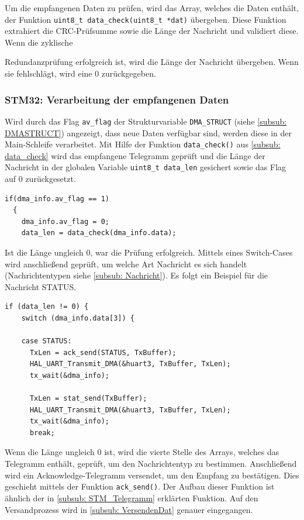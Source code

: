 \smallskip

Um die empfangenen Daten zu prüfen, wird das Array, welches die Daten enthält, der Funktion \lstinline!uint8_t data_check(uint8_t *dat)!
übergeben. Diese Funktion extrahiert die CRC-Prüfsumme sowie die Länge der Nachricht und validiert diese. Wenn die zyklische 

Redundanzprüfung erfolgreich ist, wird die Länge der Nachricht übergeben. Wenn sie fehlschlägt, wird eine 0 zurückgegeben.

\newpage
\subsubsection{STM32: Verarbeitung der empfangenen Daten}
Wird durch das Flag \lstinline!av_flag! der Strukturvariable \lstinline!DMA_STRUCT! (siehe \ref{subsub: DMASTRUCT}) angezeigt, dass neue Daten
verfügbar sind, werden diese in der Main-Schleife verarbeitet. Mit Hilfe der Funktion \lstinline!data_check()! aus \ref{subsub: data_check}
wird das empfangene Telegramm geprüft und die Länge der Nachricht in der globalen Variable \lstinline!uint8_t data_len! gesichert sowie das Flag
auf 0 zurückgesetzt.

\begin{lstlisting}[caption={\textit{Datenverarbeitung}}]
  if(dma_info.av_flag == 1)
  {
    dma_info.av_flag = 0;
    data_len = data_check(dma_info.data);
\end{lstlisting}

Ist die Länge ungleich 0, war die Prüfung erfolgreich. Mittels eines Switch-Cases wird anschließend geprüft, um welche Art Nachricht
es sich handelt (Nachrichtentypen siehe \ref{subsub: Nachricht}). Es folgt ein Beispiel für die Nachricht STATUS.

\begin{lstlisting}[caption={\textit{Switch Case}}]
  if (data_len != 0) {
    switch (dma_info.data[3]) {

    case STATUS:
      TxLen = ack_send(STATUS, TxBuffer);
      HAL_UART_Transmit_DMA(&huart3, TxBuffer, TxLen);
      tx_wait(&dma_info);

      TxLen = stat_send(TxBuffer);
      HAL_UART_Transmit_DMA(&huart3, TxBuffer, TxLen);
      tx_wait(&dma_info);
      break;
\end{lstlisting}

Wenn die Länge ungleich 0 ist, wird die vierte Stelle des Arrays, welches das Telegramm enthält, geprüft, um den Nachrichtentyp zu bestimmen.
Anschließend wird ein Acknowledge-Telegramm versendet, um den Empfang zu bestätigen. Dies geschieht mittels 
der Funktion \lstinline!ack_send()!. Der Aufbau dieser Funktion ist ähnlich der in \ref{subsub: STM_Telegramm}
erklärten Funktion. Auf den Versandprozess wird in \ref{subsub: VersendenDat} genauer eingegangen. 

